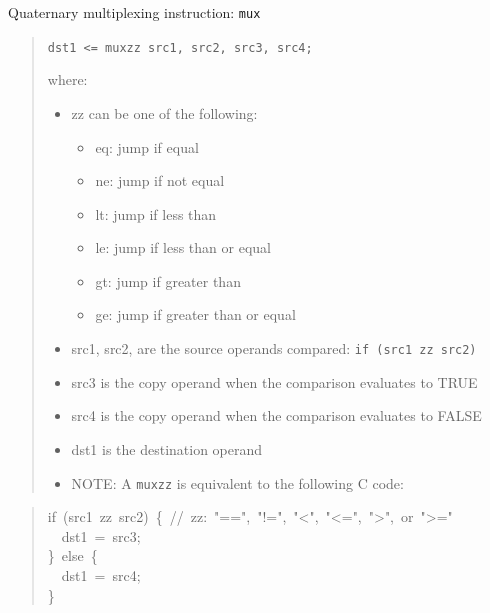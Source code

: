 \documentclass[a4paper]{article}
\begin{document}
Quaternary multiplexing instruction: \texttt{mux}
%
\begin{quote}

\texttt{dst1 <= muxzz src1, src2, src3, src4;}

where:
%
\begin{itemize}

\item zz can be one of the following:
%
\begin{itemize}

\item eq: jump if equal

\item ne: jump if not equal

\item lt: jump if less than

\item le: jump if less than or equal

\item gt: jump if greater than

\item ge: jump if greater than or equal

\end{itemize}

\item src1, src2, are the source operands compared: \texttt{if (src1 zz src2)}

\item src3 is the copy operand when the comparison evaluates to TRUE

\item src4 is the copy operand when the comparison evaluates to FALSE

\item dst1 is the destination operand

\item NOTE: A \texttt{muxzz} is equivalent to the following C code:

\end{itemize}

\end{quote}
%
\begin{quote}{\ttfamily \raggedright \noindent
if~(src1~zz~src2)~\{~//~zz:~"==",~"!=",~"<",~"<=",~">",~or~">="\\
~~dst1~=~src3;\\
\}~else~\{\\
~~dst1~=~src4;\\
\}
}
\end{quote}
\end{document}
